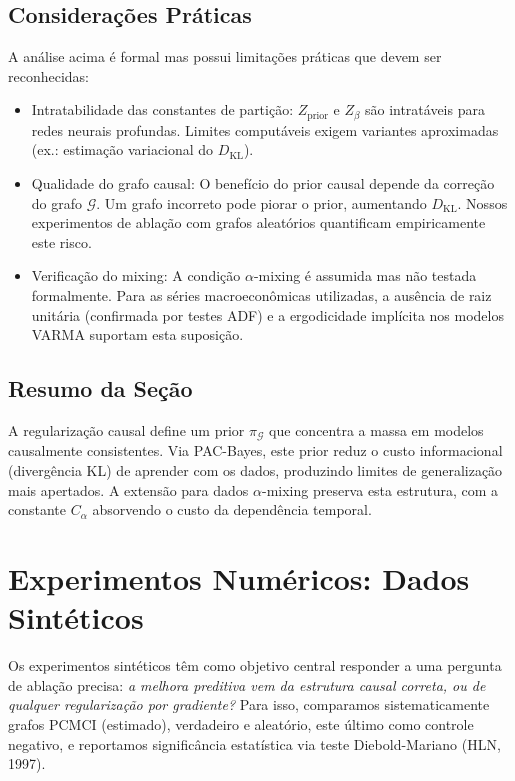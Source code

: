 \documentclass[12pt, a4paper]{article}
\begin{document}
\subsection{Considerações Práticas}

A análise acima é formal mas possui limitações práticas que devem ser reconhecidas:
\begin{itemize}
    \item Intratabilidade das constantes de partição: $Z_{\mathrm{prior}}$ e $Z_{\beta}$ são intratáveis para redes neurais profundas. Limites computáveis exigem variantes aproximadas (ex.: estimação variacional do $D_{\mathrm{KL}}$).
    \item Qualidade do grafo causal: O benefício do prior causal depende da correção do grafo $\mathcal{G}$. Um grafo incorreto pode piorar o prior, aumentando $D_{\mathrm{KL}}$. Nossos experimentos de ablação com grafos aleatórios quantificam empiricamente este risco.
    \item Verificação do mixing: A condição $\alpha$-mixing é assumida mas não testada formalmente. Para as séries macroeconômicas utilizadas, a ausência de raiz unitária (confirmada por testes ADF) e a ergodicidade implícita nos modelos VARMA suportam esta suposição.
\end{itemize}

\subsection*{Resumo da Seção}

A regularização causal define um prior $\pi_{\mathcal G}$ que concentra a massa em modelos causalmente consistentes. Via PAC-Bayes, este prior reduz o custo informacional (divergência KL) de aprender com os dados, produzindo limites de generalização mais apertados. A extensão para dados $\alpha$-mixing preserva esta estrutura, com a constante $C_{\alpha}$ absorvendo o custo da dependência temporal.



\section{Experimentos Numéricos: Dados Sintéticos}

Os experimentos sintéticos têm como objetivo central responder a uma pergunta de ablação precisa: \emph{a melhora preditiva vem da estrutura causal correta, ou de qualquer regularização por gradiente?} Para isso, comparamos sistematicamente grafos PCMCI (estimado), verdadeiro e aleatório, este último como controle negativo, e reportamos significância estatística via teste Diebold-Mariano (HLN, 1997).
\end{document}
